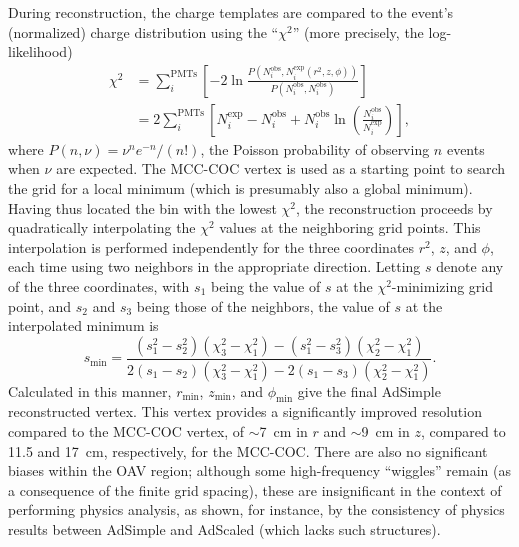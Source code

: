\documentclass[../thesis.tex]{subfiles}
\begin{document}
\newcommand\Niobs{N_i^{\mathrm{obs}}}
\newcommand\Niexp{N_i^{\mathrm{exp}}}

During reconstruction, the charge templates are compared to the event's (normalized) charge distribution using the ``$\chi^2$'' (more precisely, the log-likelihood)
\begin{align*}
  \chi^2 &= \sum_i^{\mathrm{PMTs}}\left[ -2 \ln \frac{P(\Niobs, \Niexp(r^2, z, \phi))}
        {P(\Niobs, \Niobs)} \right] \\
      &= 2 \sum_i^{\mathrm{PMTs}} \left[ \Niexp - \Niobs+ \Niobs \ln \left( \frac{\Niobs}{\Niexp} \right) \right],
\end{align*}
where $P(n, \nu) = \nu^n e^{-n} / (n!)$, the Poisson probability of observing $n$ events when $\nu$ are expected. The MCC-COC vertex is used as a starting point to search the grid for a local minimum (which is presumably also a global minimum). Having thus located the bin with the lowest $\chi^2$, the reconstruction proceeds by quadratically interpolating the $\chi^2$ values at the neighboring grid points. This interpolation is performed independently for the three coordinates $r^2$, $z$, and $\phi$, each time using two neighbors in the appropriate direction. Letting $s$ denote any of the three coordinates, with $s_1$ being the value of $s$ at the $\chi^2$-minimizing grid point, and $s_2$ and $s_3$ being those of the neighbors, the value of $s$ at the interpolated minimum is
\begin{equation*}
  s_{\mathrm{min}} = \frac{(s_1^2 - s_2^2)(\chi_3^2 - \chi_1^2) - (s_1^2 - s_3^2)(\chi_2^2 - \chi_1^2)}{2(s_1 - s_2)(\chi_3^2 - \chi_1^2) - 2(s_1 - s_3)(\chi_2^2 - \chi_1^2)}.
\end{equation*}
Calculated in this manner, $r_{\mathrm{min}}$, $z_{\mathrm{min}}$, and $\phi_{\mathrm{min}}$ give the final AdSimple reconstructed vertex. This vertex provides a significantly improved resolution compared to the MCC-COC vertex, of $\sim$7~cm in $r$ and $\sim$9~cm in $z$, compared to 11.5 and 17~cm, respectively, for the MCC-COC. There are also no significant biases within the OAV region; although some high-frequency ``wiggles'' remain (as a consequence of the finite grid spacing), these are insignificant in the context of performing physics analysis, as shown, for instance, by the consistency of physics results between AdSimple and AdScaled (which lacks such structures).
\end{document}
